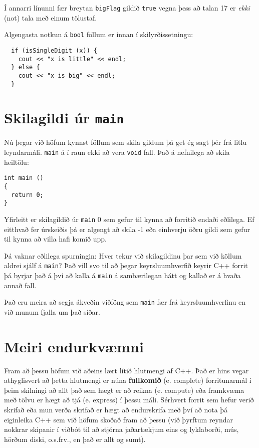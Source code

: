 Í annarri línunni fær breytan {\tt bigFlag} gildið {\tt true} vegna þess að talan 17 er {\em ekki} (not) tala með einum tölustaf.

Algengasta notkun á {\tt bool} föllum er innan í skilyrðissetningu: 

\begin{verbatim}
  if (isSingleDigit (x)) {
    cout << "x is little" << endl;
  } else {
    cout << "x is big" << endl;
  }
\end{verbatim}

\section {Skilagildi úr {\tt main}}

Nú þegar við höfum kynnst föllum sem skila gildum þá get ég sagt þér frá litlu leyndarmáli.
{\tt main} á í raun ekki að vera {\tt void} fall.
Það á nefnilega að skila heiltölu:

\begin{verbatim}
int main ()
{
  return 0;
}  
\end{verbatim}
%
Yfirleitt er skilagildið úr {\tt main} 0 sem gefur til kynna að forritið endaði eðlilega.
Ef eitthvað fer úrskeiðis þá er algengt að skila -1 eða einhverju öðru gildi sem gefur til kynna að villa hafi komið upp.

Þá vaknar eðlilega spurningin:
Hver tekur við skilagildinu þar sem við köllum aldrei sjálf á {\tt main}?
Það vill svo til að þegar keyrsluumhverfið keyrir C++ forrit þá byrjar það á því að kalla á {\tt main} á sambærilegan hátt og kallað er á hvaða annað fall.

Það eru meira að segja ákveðin viðföng sem {\tt main} fær frá keyrsluumhverfinu en við munum fjalla um það síðar.

\section {Meiri endurkvæmni}

Fram að þessu höfum við aðeins lært lítið hlutmengi af C++.
Það er hins vegar athyglisvert að þetta hlutmengi er núna {\bf fullkomið} (e. complete) forritunarmál í þeim skilningi að allt það sem hægt er að reikna (e. compute) eða framkvæma með tölvu er hægt að tjá (e. express) í þessu máli.
Sérhvert forrit sem hefur verið skrifað eða mun verða skrifað er hægt að endurskrifa með því að nota þá eiginleika C++ sem við höfum skoðað fram að þessu 
(við þyrftum reyndar nokkrar skipanir í viðbót til að stjórna jaðartækjum eins og lyklaborði, mús, hörðum diski, o.s.frv., en það er allt og sumt).

